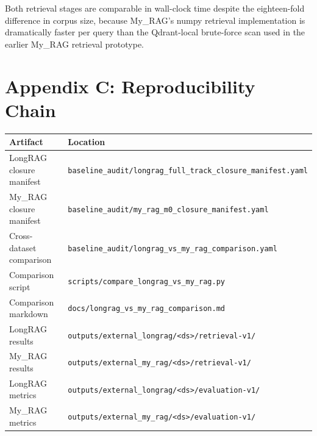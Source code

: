 \documentclass[11pt,a4paper]{article}
\begin{document}
Both retrieval stages are comparable in wall-clock time despite the
eighteen-fold difference in corpus size, because My\_RAG's numpy
retrieval implementation is dramatically faster per query than the
Qdrant-local brute-force scan used in the earlier My\_RAG retrieval
prototype.

\section{Appendix C: Reproducibility Chain}

\begin{center}
\small
\begin{tabular}{l l}
\toprule
\textbf{Artifact} & \textbf{Location} \\
\midrule
LongRAG closure manifest & \texttt{baseline\_audit/longrag\_full\_track\_closure\_manifest.yaml} \\
My\_RAG closure manifest & \texttt{baseline\_audit/my\_rag\_m0\_closure\_manifest.yaml} \\
Cross-dataset comparison & \texttt{baseline\_audit/longrag\_vs\_my\_rag\_comparison.yaml} \\
Comparison script & \texttt{scripts/compare\_longrag\_vs\_my\_rag.py} \\
Comparison markdown & \texttt{docs/longrag\_vs\_my\_rag\_comparison.md} \\
LongRAG results & \texttt{outputs/external\_longrag/<ds>/retrieval-v1/} \\
My\_RAG results & \texttt{outputs/external\_my\_rag/<ds>/retrieval-v1/} \\
LongRAG metrics & \texttt{outputs/external\_longrag/<ds>/evaluation-v1/} \\
My\_RAG metrics & \texttt{outputs/external\_my\_rag/<ds>/evaluation-v1/} \\
\bottomrule
\end{tabular}
\end{center}
\end{document}
